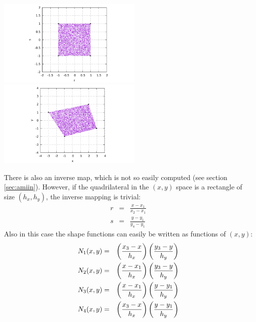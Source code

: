 \begin{center}
\includegraphics[width=7cm]{images/mappings/bilinear/rs.pdf}
\includegraphics[width=7cm]{images/mappings/bilinear/xy.pdf}
\end{center}

There is also an inverse map, which is not so easily computed (see section \ref{sec:amiin}).
However, if the quadrilateral in the $(x,y)$ space is a rectangle of size $(h_x,h_y)$, 
the inverse mapping is trivial:
\begin{eqnarray}
r&=&\frac{x-x_1}{x_2-x_1} \\
s&=&\frac{y-y_1}{y_4-y_1} 
\end{eqnarray}
Also in this case the shape functions can easily be written as functions of $(x,y)$:
\begin{eqnarray}
N_1(x,y) &=& \left( \frac{x_3 -x }{h_x}  \right) \left( \frac{y_3 -y }{h_y}  \right) \nonumber\\
N_2(x,y) &=& \left( \frac{x - x_1}{h_x}  \right) \left( \frac{y_3 -y }{h_y}  \right) \nonumber\\
N_3(x,y) &=& \left( \frac{x - x_1}{h_x}  \right) \left( \frac{y - y_1}{h_y}  \right) \nonumber\\
N_4(x,y) &=& \left( \frac{x_3 -x }{h_x}  \right) \left( \frac{y - y_1}{h_y}  \right) \nonumber 
\end{eqnarray}

